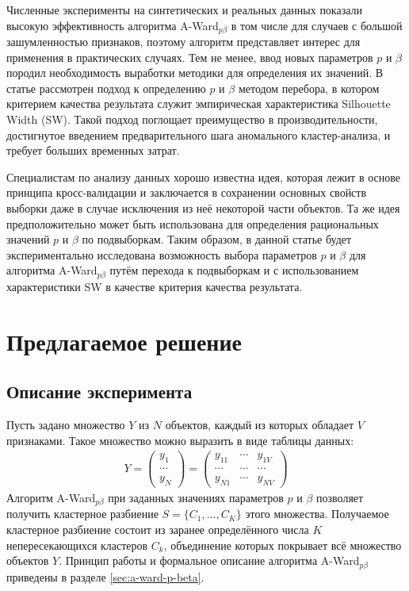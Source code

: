 \documentclass[12pt]{a&t}
\begin{document}
Численные эксперименты на синтетических и реальных данных показали высокую эффективность алгоритма \mbox{A-Ward$ _{p\beta} $} в том числе для случаев с большой зашумленностью признаков, поэтому алгоритм представляет интерес для применения в практических случаях. Тем не менее, ввод новых параметров $ p $ и $ \beta $ породил необходимость выработки методики для определения их значений. В статье \cite{SW-Based-Search} рассмотрен подход к определению $ p $ и $ \beta $ методом перебора, в котором критерием качества результата служит эмпирическая характеристика Silhouette Width (SW)\cite{SW-Canonical}. Такой подход поглощает преимущество в производительности, достигнутое введением предварительного шага аномального кластер-анализа, и требует больших временных затрат.

Специалистам по анализу данных хорошо известна идея, которая лежит в основе принципа кросс-валидации \cite{None} и заключается в сохранении основных свойств выборки даже в случае исключения из неё некоторой части объектов. Та же идея предположительно может быть использована для определения рациональных значений $ p $ и $ \beta $ по подвыборкам. Таким образом, в данной статье будет экспериментально исследована возможность выбора параметров $ p $ и $ \beta $ для алгоритма \mbox{A-Ward$ _{p\beta} $} путём перехода к подвыборкам и с использованием характеристики SW в качестве критерия качества результата.

\section{Предлагаемое решение}
\subsection{Описание эксперимента}
Пусть задано множество $ Y $ из $ N $ объектов, каждый из которых обладает $ V $ признаками. Такое множество можно выразить в виде таблицы данных:
\begin{gather} \label{Y-table}
	Y= \begin{pmatrix} 
	y_{1} \\
	\cdots \\ 
	y_{N} 
	\end{pmatrix}
	= \begin{pmatrix} 
		y_{11} & \cdots  & y_{1V} \\ 
		\cdots & \cdots  & \cdots \\ 
		y_{N1} & \cdots  & y_{NV} 
	\end{pmatrix}
\end{gather}
Алгоритм \mbox{A-Ward$ _{p\beta} $} при заданных значениях параметров $ p $ и $ \beta $  позволяет получить кластерное разбиение $ S=\{C_1, \ldots, C_K\} $  этого множества. Получаемое кластерное разбиение состоит из заранее определённого числа $ K $ непересекающихся кластеров $ C_k $, объединение которых покрывает всё множество объектов $ Y $. Принцип работы и формальное описание алгоритма \mbox{A-Ward$ _{p\beta} $} приведены в разделе \ref{sec:a-ward-p-beta}.
\end{document}
